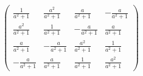 \[ \left(\begin{array}{cccc}  \frac{ 1 }{a^2 + 1}  &  \frac{ a^2 }{
a^2 + 1 }  &  \frac{ a }{ a^2 + 1 }  &  -\frac{ a }{ a^2 + 1 }  \\
\frac{ a^2 }{ a^2 + 1 }  &  \frac{ 1 }{a^2 + 1}  &  -\frac{ a }{ a^2 +
1 }  &  \frac{ a }{ a^2 + 1 }  \\  \frac{ a }{ a^2 + 1 }  &  -\frac{ a
}{ a^2 + 1 }  &  \frac{ a^2 }{ a^2 + 1 }  &  \frac{ 1 }{a^2 + 1}  \\
-\frac{ a }{ a^2 + 1 }  &  \frac{ a }{ a^2 + 1 }  &  \frac{ 1 }{a^2 +
1}  &  \frac{ a^2 }{ a^2 + 1 }  \end{array}\right) \]
